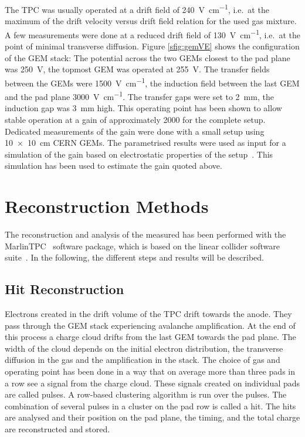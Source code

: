 \documentclass[preprint]{elsarticle}
\begin{document}
The TPC was usually operated at a drift field of \SI{240}{\V \per \cm}, i.e.\ at the maximum of the drift velocity versus drift field relation for the used gas mixture. A few measurements were done at a reduced drift field of \SI[per-mode=symbol]{130}{\V \per \cm}, i.e.\ at the point of minimal transverse diffusion.
Figure \ref{sfig:gemVE} shows the configuration of the GEM stack: The potential across the two GEMs closest to the pad plane was \SI{250}{\V}, the topmost GEM was operated at \SI{255}{\V}. 
The transfer fields between the GEMs were \SI{1500}{\V \per \cm}, the induction field between the last GEM and the pad plane \SI{3000}{\V \per \cm}.
The transfer gaps were set to \SI{2}{\mm}, the induction gap was \SI{3}{\mm} high. This operating point has been shown to allow stable operation at a gain of approximately 2000 for the complete setup. Dedicated measurements of the gain were done with a small setup using \SI{10 x 10}{\cm} CERN GEMs. The parametrised results were used as input for a simulation of the gain based on electrostatic properties of the setup~\cite{ZenkerPhD}. This simulation has been used to estimate the gain quoted above. 




\section{Reconstruction Methods}
\label{sec:reco}
The reconstruction and analysis of the measured has been performed with the MarlinTPC~\cite{MarlinTPC} software package, which is based on the linear collider software suite~\cite{lcsoft,Marlin,lcio}. In the following, the different steps and results will be described.

\subsection{Hit Reconstruction}
\label{sec:hitreco}
Electrons created in the drift volume of the TPC drift towards the anode. They pass through the GEM stack experiencing avalanche amplification. At the end of this process a charge cloud drifts from the last GEM towards the pad plane. The width of the cloud depends on the initial electron distribution, the transverse diffusion in the gas and the amplification in the stack. The choice of gas and operating point has been done in a way that on average more than three pads in a row see a signal from the charge cloud. 
These signals created on individual pads are called pulses. A row-based clustering algorithm is run over the pulses. The combination of several pulses in a cluster on the pad row is called a hit. The hits are analysed and their position on the pad plane, the timing, and the total charge are reconstructed and stored. 
\end{document}
